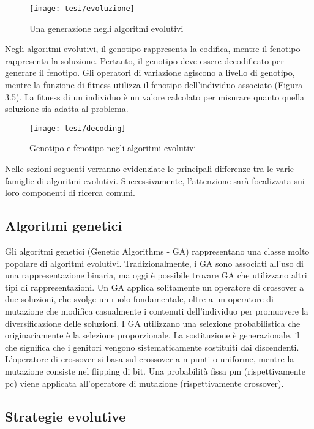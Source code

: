 \begin{figure}[!ht] 
    \centering 
    \texttt{[image: tesi/evoluzione]} 
    \caption{Una generazione negli algoritmi evolutivi}
\end{figure}

Negli algoritmi evolutivi, il genotipo rappresenta la codifica, mentre il fenotipo rappresenta la soluzione. Pertanto, il genotipo deve essere decodificato per generare il fenotipo. Gli operatori di variazione agiscono a livello di genotipo, mentre la funzione di fitness utilizza il fenotipo dell'individuo associato (Figura 3.5). La fitness di un individuo è un valore calcolato per misurare quanto quella soluzione sia adatta al problema. 

\begin{figure}[!ht] 
    \centering 
    \texttt{[image: tesi/decoding]} 
    \caption{Genotipo e fenotipo negli algoritmi evolutivi}
\end{figure}

Nelle sezioni seguenti verranno evidenziate le principali differenze tra le varie famiglie di algoritmi evolutivi. Successivamente, l'attenzione sarà focalizzata sui loro componenti di ricerca comuni.

\subsection{Algoritmi genetici}

Gli algoritmi genetici (Genetic Algorithms - GA) rappresentano una classe molto popolare di algoritmi evolutivi. Tradizionalmente, i GA sono associati all'uso di una rappresentazione binaria, ma oggi è possibile trovare GA che utilizzano altri tipi di rappresentazioni. Un GA applica solitamente un operatore di crossover a due soluzioni, che svolge un ruolo fondamentale, oltre a un operatore di mutazione che modifica casualmente i contenuti dell'individuo per promuovere la diversificazione delle soluzioni. I GA utilizzano una selezione probabilistica che originariamente è la selezione proporzionale. La sostituzione è generazionale, il che significa che i genitori vengono sistematicamente sostituiti dai discendenti. L'operatore di crossover si basa sul crossover a n punti o uniforme, mentre la mutazione consiste nel flipping di bit. Una probabilità fissa pm (rispettivamente pc) viene applicata all'operatore di mutazione (rispettivamente crossover).

\subsection{Strategie evolutive}


